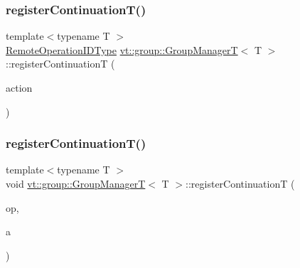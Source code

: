 \subsubsection{\texorpdfstring{register\+Continuation\+T()}{registerContinuationT()}\hspace{0.1cm}{\footnotesize\ttfamily [1/2]}}
{\footnotesize\ttfamily template$<$typename T $>$ \\
\hyperlink{namespacevt_1_1group_a73f2624ddeb535b39a08b6524f26b244}{Remote\+Operation\+I\+D\+Type} \hyperlink{structvt_1_1group_1_1_group_manager_t}{vt\+::group\+::\+Group\+ManagerT}$<$ T $>$\+::register\+ContinuationT (\begin{DoxyParamCaption}\item[{\hyperlink{structvt_1_1group_1_1_group_manager_t_acb20922687d3165d97de391fdbaf02ca}{Action\+T\+Type}}]{action }\end{DoxyParamCaption})\hspace{0.3cm}{\ttfamily [static]}}

\mbox{\label{structvt_1_1group_1_1_group_manager_t_a0c366044c727d883691f89550c9706cd}} 
\subsubsection{\texorpdfstring{register\+Continuation\+T()}{registerContinuationT()}\hspace{0.1cm}{\footnotesize\ttfamily [2/2]}}
{\footnotesize\ttfamily template$<$typename T $>$ \\
void \hyperlink{structvt_1_1group_1_1_group_manager_t}{vt\+::group\+::\+Group\+ManagerT}$<$ T $>$\+::register\+ContinuationT (\begin{DoxyParamCaption}\item[{\hyperlink{namespacevt_1_1group_a73f2624ddeb535b39a08b6524f26b244}{Remote\+Operation\+I\+D\+Type} const \&}]{op,  }\item[{\hyperlink{structvt_1_1group_1_1_group_manager_t_acb20922687d3165d97de391fdbaf02ca}{Action\+T\+Type}}]{a }\end{DoxyParamCaption})\hspace{0.3cm}{\ttfamily [static]}}

\mbox{\label{structvt_1_1group_1_1_group_manager_t_a654b43bfc4360ba5c7f4a1680378bdad}} 
